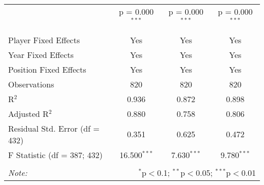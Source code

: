 \documentclass[12pt]{article}
\begin{document}
\begin{sidewaystable}[!htbp]
\begin{tabular}{@{\extracolsep{5pt}}lccc}
			& p = 0.000$^{***}$ & p = 0.000$^{***}$ & p = 0.000$^{***}$ \\ 
			& & & \\ 
			\hline \\[-1.8ex] 
			Player Fixed Effects & Yes & Yes & Yes \\ 
			Year Fixed Effects & Yes & Yes & Yes \\ 
			Position Fixed Effects & Yes & Yes & Yes \\ 
			Observations & 820 & 820 & 820 \\ 
			R$^{2}$ & 0.936 & 0.872 & 0.898 \\ 
			Adjusted R$^{2}$ & 0.880 & 0.758 & 0.806 \\ 
			Residual Std. Error (df = 432) & 0.351 & 0.625 & 0.472 \\ 
			F Statistic (df = 387; 432) & 16.500$^{***}$ & 7.630$^{***}$ & 9.780$^{***}$ \\ 
			\hline 
			\hline \\[-1.8ex] 
			\textit{Note:}  & \multicolumn{3}{r}{$^{*}$p$<$0.1; $^{**}$p$<$0.05; $^{***}$p$<$0.01} \\ 
		\end{tabular} 
	\end{sidewaystable} 
\end{document}
